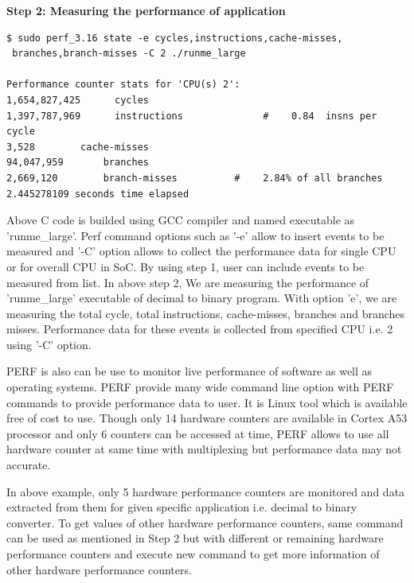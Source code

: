 \textbf{Step 2: Measuring the performance of application}

\begin{lstlisting}
$ sudo perf_3.16 state -e cycles,instructions,cache-misses,
 branches,branch-misses -C 2 ./runme_large

Performance counter stats for 'CPU(s) 2':     
1,654,827,425      cycles                        
1,397,787,969      instructions              #    0.84  insns per cycle                    
3,528     	 cache-misses                                                       
94,047,959     	 branches                                                             
2,669,120    	 branch-misses          #    2.84% of all branches              
2.445278109 seconds time elapsed
\end{lstlisting}

\par Above C code is builded using GCC compiler and named executable as 'runme\_large'. Perf command options such as '-e' allow to insert events to be measured and '-C' option allows to collect the performance data for single CPU or for overall CPU in SoC. By using step 1, user can include events to be measured from list. In above step 2, We are measuring the performance of 'runme\_large' executable of decimal to binary program. With option 'e', we are measuring the total cycle, total instructions, cache-misses, branches and branches misses. Performance data for these events is collected from specified CPU i.e. 2 using '-C' option. 

\par PERF is also can be use to monitor live performance of software as well as operating systems. PERF provide many wide command line option with PERF commands to provide performance data to user. It is Linux tool which is available free of cost to use. Though only 14 hardware counters are available in Cortex A53 processor and only 6 counters can be accessed at time, PERF allows to use all hardware counter at same time with multiplexing but performance data may not accurate. 

\par In above example, only 5 hardware performance counters are monitored and data extracted from them for given specific application i.e. decimal to binary converter. To get values of other hardware performance counters, same command can be used as mentioned in Step 2 but with different or remaining hardware performance counters and execute new command to get more information of other hardware performance counters. 

